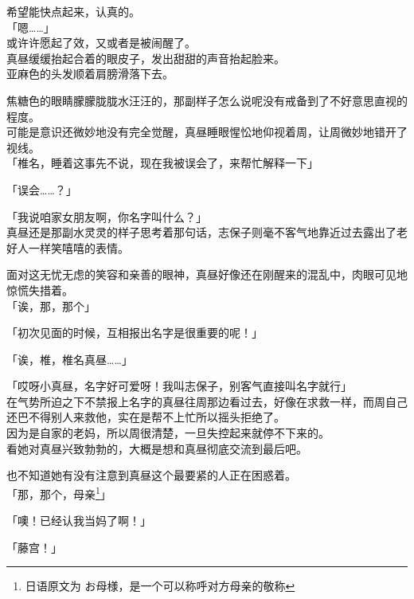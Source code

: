 希望能快点起来，认真的。\\

「嗯……」\\

或许许愿起了效，又或者是被闹醒了。\\

真昼缓缓抬起合着的眼皮子，发出甜甜的声音抬起脸来。\\

亚麻色的头发顺着肩膀滑落下去。

焦糖色的眼睛朦朦胧胧水汪汪的，那副样子怎么说呢没有戒备到了不好意思直视的程度。\\

可能是意识还微妙地没有完全觉醒，真昼睡眼惺忪地仰视着周，让周微妙地错开了视线。\\

「椎名，睡着这事先不说，现在我被误会了，来帮忙解释一下」

「误会……？」

「我说咱家女朋友啊，你名字叫什么？」\\

真昼还是那副水灵灵的样子思考着那句话，志保子则毫不客气地靠近过去露出了老好人一样笑嘻嘻的表情。

面对这无忧无虑的笑容和亲善的眼神，真昼好像还在刚醒来的混乱中，肉眼可见地惊慌失措着。\\

「诶，那，那个」

「初次见面的时候，互相报出名字是很重要的呢！」

「诶，椎，椎名真昼……」

「哎呀小真昼，名字好可爱呀！我叫志保子，别客气直接叫名字就行」\\

在气势所迫之下不禁报上名字的真昼往周那边看过去，好像在求救一样，而周自己还巴不得别人来救他，实在是帮不上忙所以摇头拒绝了。\\

因为是自家的老妈，所以周很清楚，一旦失控起来就停不下来的。\\

看她对真昼兴致勃勃的，大概是想和真昼彻底交流到最后吧。

也不知道她有没有注意到真昼这个最要紧的人正在困惑着。\\

「那，那个，母亲\footnote{日语原文为 {\jpfont お母様}，是一个可以称呼对方母亲的敬称}」

「噢！已经认我当妈了啊！」

「藤宫！」

